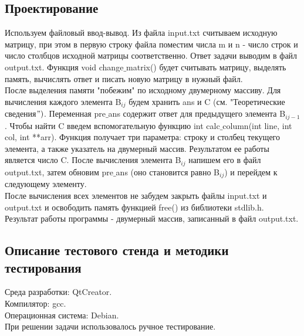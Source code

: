 \documentclass[12pt,a4paper]{report}
\begin{document}
\subsection{Проектирование}
Используем файловый ввод-вывод. Из файла input.txt считываем исходную матрицу, при этом в первую строку файла поместим числа m и n - число строк и число столбцов исходной матрицы соответственно. Ответ задачи выводим в файл output.txt. Функция void change$\_$matrix() будет считывать матрицу, выделять память, вычислять ответ и писать новую матрицу в нужный файл. \\
После выделения памяти "побежим" по исходному двумерному массиву. Для вычисления каждого элемента B$_{i j}$ будем хранить ans и C (см. "Теоретические сведения$")$. Переменная pre$\_$ans содержит ответ для предыдущего элемента B$_{i j-1}$. Чтобы найти C введем вспомогательную функцию int calc$\_$column(int line, int col, int **arr). Функция получает три параметра: строку и столбец текущего элемента, а также указатель на двумерный массив. Результатом ее работы является число C. После вычисления элемента B$_{i j}$ напишем его в файл output.txt, затем обновим pre$\_$ans (оно становится равно B$_{i j}$) и перейдем к следующему элементу. \\
После вычисления всех элементов не забудем закрыть файлы input.txt и output.txt и освободить память функцией free() из библиотеки stdlib.h. \\
Результат работы программы - двумерный массив, записанный в файл output.txt. 
\subsection{Описание тестового стенда и методики тестирования}
Среда разработки: QtCreator.\\
Компилятор: gcc. \\
Операционная система: Debian. \\
При решении задачи использовалось ручное тестирование. 
\end{document}
